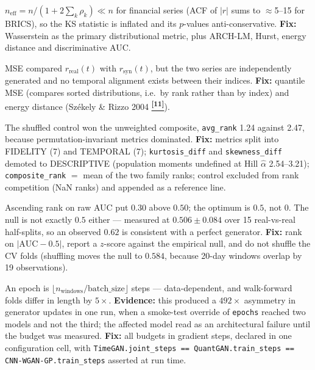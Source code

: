 \documentclass[10pt]{article}
\newcommand{\auditrow}[5]{%
  \begin{tcolorbox}[mybox={#2}{#3},
    title={\textbf{[#1]}\quad #4},
    before skip=4pt, after skip=4pt, breakable]
  \small #5
  \end{tcolorbox}}
\newcommand{\tcite}[1]{%
  \hyperlink{R:#1}{\textsuperscript{\scriptsize\textbf{[#1]}}}}
\begin{document}
\vspace{4pt}

\auditrow{FIXED}{DRed}{RBg}%
  {KS / Welch tests assumed i.i.d.\ --- CRITICAL}%
  {$n_\text{eff} = n/(1+2\sum_k\rho_k) \ll n$ for financial series (ACF of $|r|$ sums to $\approx$5--15 for BRICS), so the KS statistic is inflated and its $p$-values anti-conservative. \textbf{Fix:} Wasserstein as the primary distributional metric, plus ARCH-LM, Hurst, energy distance and discriminative AUC.}

\auditrow{FIXED}{DRed}{RBg}%
  {Pointwise MSE/MAE had no semantic meaning}%
  {MSE compared $r_\text{real}(t)$ with $r_\text{syn}(t)$, but the two series are independently generated and no temporal alignment exists between their indices. \textbf{Fix:} quantile MSE (compares sorted distributions, i.e.\ by rank rather than by index) and energy distance (Sz\'{e}kely \& Rizzo 2004\tcite{11}).}

\auditrow{FIXED}{Amber}{ABg}%
  {Composite ranking: fidelity/temporal split $+$ control exclusion}%
  {The shuffled control won the unweighted composite, \texttt{avg\_rank} 1.24 against 2.47, because permutation-invariant metrics dominated. \textbf{Fix:} metrics split into FIDELITY (7) and TEMPORAL (7); \texttt{kurtosis\_diff} and \texttt{skewness\_diff} demoted to DESCRIPTIVE (population moments undefined at Hill $\hat\alpha$ 2.54--3.21); \texttt{composite\_rank} $=$ mean of the two family ranks; control excluded from rank competition (NaN ranks) and appended as a reference line.}

\auditrow{FIXED}{Amber}{ABg}%
  {Discriminative AUC: direction inverted, and no null calibration}%
  {Ascending rank on raw AUC put $0.30$ above $0.50$; the optimum is $0.5$, not $0$. The null is not exactly $0.5$ either --- measured at $0.506\pm0.084$ over 15 real-vs-real half-splits, so an observed $0.62$ is consistent with a perfect generator. \textbf{Fix:} rank on $|\text{AUC}-0.5|$, report a $z$-score against the empirical null, and do not shuffle the CV folds (shuffling moves the null to $0.584$, because 20-day windows overlap by 19 observations).}

\auditrow{FIXED}{Amber}{ABg}%
  {Budgets specified in epochs rather than gradient steps}%
  {An epoch is $\lfloor n_\text{windows}/\text{batch\_size}\rfloor$ steps --- data-dependent, and walk-forward folds differ in length by $5\times$. \textbf{Evidence:} this produced a $492\times$ asymmetry in generator updates in one run, when a smoke-test override of \texttt{epochs} reached two models and not the third; the affected model read as an architectural failure until the budget was measured. \textbf{Fix:} all budgets in gradient steps, declared in one configuration cell, with \texttt{TimeGAN.joint\_steps == QuantGAN.train\_steps == CNN-WGAN-GP.train\_steps} asserted at run time.}
\end{document}

